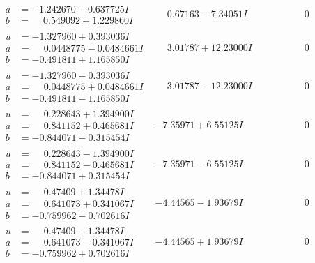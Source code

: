 \documentclass[1p]{elsarticle_modified}
\theoremstyle{definition}
\begin{document}
$$\begin{array}{c|c|c}
\begin{aligned}
a &= -1.242670 - 0.637725 I \\
b &= \phantom{-}0.549092 + 1.229860 I\end{aligned}
 & \phantom{-}0.67163 - 7.34051 I & \phantom{-0.000000 } 0 \\ \hline\begin{aligned}
u &= -1.327960 + 0.393036 I \\
a &= \phantom{-}0.0448775 - 0.0484661 I \\
b &= -0.491811 + 1.165850 I\end{aligned}
 & \phantom{-}3.01787 + 12.23000 I & \phantom{-0.000000 } 0 \\ \hline\begin{aligned}
u &= -1.327960 - 0.393036 I \\
a &= \phantom{-}0.0448775 + 0.0484661 I \\
b &= -0.491811 - 1.165850 I\end{aligned}
 & \phantom{-}3.01787 - 12.23000 I & \phantom{-0.000000 } 0 \\ \hline\begin{aligned}
u &= \phantom{-}0.228643 + 1.394900 I \\
a &= \phantom{-}0.841152 + 0.465681 I \\
b &= -0.844071 - 0.315454 I\end{aligned}
 & -7.35971 + 6.55125 I & \phantom{-0.000000 } 0 \\ \hline\begin{aligned}
u &= \phantom{-}0.228643 - 1.394900 I \\
a &= \phantom{-}0.841152 - 0.465681 I \\
b &= -0.844071 + 0.315454 I\end{aligned}
 & -7.35971 - 6.55125 I & \phantom{-0.000000 } 0 \\ \hline\begin{aligned}
u &= \phantom{-}0.47409 + 1.34478 I \\
a &= \phantom{-}0.641073 + 0.341067 I \\
b &= -0.759962 - 0.702616 I\end{aligned}
 & -4.44565 - 1.93679 I & \phantom{-0.000000 } 0 \\ \hline\begin{aligned}
u &= \phantom{-}0.47409 - 1.34478 I \\
a &= \phantom{-}0.641073 - 0.341067 I \\
b &= -0.759962 + 0.702616 I\end{aligned}
 & -4.44565 + 1.93679 I & \phantom{-0.000000 } 0 \\ \hline\begin{aligned}

\end{aligned}
\end{array}$$
\end{document}
